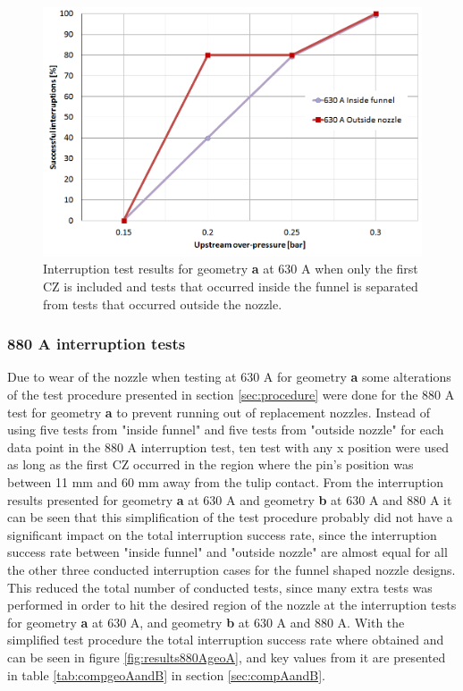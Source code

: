 \documentclass[10pt,b5paper,twoside]{article}
\begin{document}
\begin{figure}[H]
\centering
\includegraphics[scale=0.45]{Bilder/Results/geoA630ampcomp.PNG}
\caption{Interruption test results for geometry \textbf{a} at 630 A when only the first CZ is included and tests that occurred inside the funnel is separated from tests that occurred outside the nozzle.} \label{fig:results630AgeoAcomp}
\end{figure}

\subsubsection*{880 A interruption tests}
Due to wear of the nozzle when testing at 630 A for geometry \textbf{a} some alterations of the test procedure presented in section \ref{sec:procedure} were done for the 880 A test for geometry \textbf{a} to prevent running out of replacement nozzles. Instead of using five tests from "inside funnel" and five tests from "outside nozzle" for each data point in the 880 A interruption test, ten test with any x position were used as long as the first CZ occurred in the region where the pin's position was between 11 mm and 60 mm away from the tulip contact. From the interruption results presented for geometry \textbf{a} at 630 A and geometry \textbf{b} at 630 A and 880 A it can be seen that this simplification of the test procedure probably did not have a significant impact on the total interruption success rate, since the interruption success rate between "inside funnel" and "outside nozzle" are almost equal for all the other three conducted interruption cases for the funnel shaped nozzle designs. This reduced the total number of conducted tests, since many extra tests was performed in order to hit the desired region of the nozzle at the interruption tests for geometry \textbf{a} at 630 A, and geometry \textbf{b} at 630 A and 880 A. With the simplified test procedure the total interruption success rate where obtained and can be seen in figure \ref{fig:results880AgeoA}, and key values from it are presented in table \ref{tab:compgeoAandB} in section \ref{sec:compAandB}.
\end{document}
